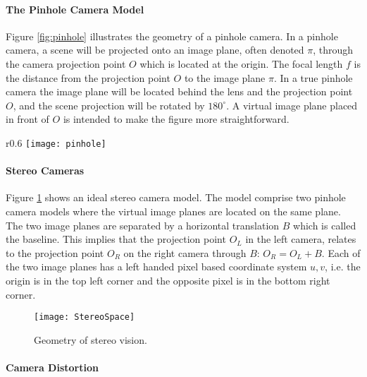 \paragraph{The Pinhole Camera Model}

Figure \ref{fig:pinhole} illustrates the geometry of a pinhole camera. In a pinhole camera, a scene will be projected onto an image plane, often denoted $\pi$, through the camera projection point $O$ which is located at the origin. The focal length $f$ is the distance from the projection point $O$ to the image plane $\pi$. In a true pinhole camera the image plane will be located behind the lens and the projection point $O$, and the scene projection will be rotated by $180^{\circ}$. A virtual image plane placed in front of $O$ is intended to make the figure more straightforward. 

\begin{wrapfigure}{r}{0.6\textwidth}
    \vspace{-10pt} %
    \centering
    \texttt{[image: pinhole]}
    \caption{Geometry of a pinhole camera.}
    \vspace{-10pt} %
    \label{phantompic}
\end{wrapfigure}

\paragraph{Stereo Cameras}

Figure \ref{fig:StereoSpace} shows an ideal stereo camera model.  The model comprise two pinhole camera models where the virtual image planes are located on the same plane. The two image planes are separated by a horizontal translation $B$ which is called the baseline. This implies that the projection point $O_L$  in the left camera, relates to the projection point $O_R$ on the right camera through $B$: $O_R = O_L + B$. Each of the two image planes has a left handed pixel based coordinate system $u,v$, i.e. the origin is in the top left corner and the opposite pixel is in the bottom right corner. 

\begin{figure}
\centering
\texttt{[image: StereoSpace]}
\caption{\label{fig:StereoSpace}Geometry of stereo vision.}
\end{figure}

\paragraph{Camera Distortion}

